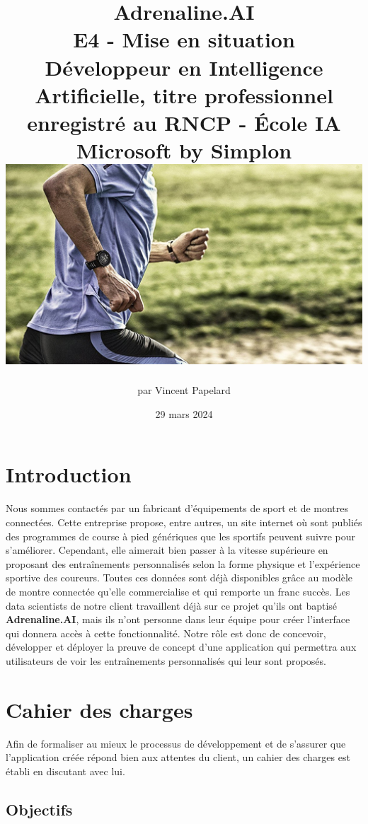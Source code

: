 \documentclass[french]{article}
\title{%
    \huge Adrenaline.AI  \\
    \bigskip
    \large E4 - Mise en situation \\ 
    Développeur en Intelligence Artificielle,
    titre professionnel enregistré au RNCP - École IA Microsoft by Simplon
    \vfill
    \includegraphics[width=14cm]{running.jpeg}
    \vfill}
\date{29 mars 2024}
\author{par Vincent Papelard}
\begin{document}
    \renewcommand{\contentsname}{Table des Matières}
    \renewcommand{\refname}{Références}
    \maketitle
    \newpage
    \tableofcontents
    \newpage

    \section*{Introduction}

    Nous sommes contactés par un fabricant d'équipements de sport et de montres connectées. Cette entreprise propose, entre autres, un site internet où sont publiés des programmes de course à pied génériques que les sportifs peuvent suivre pour s'améliorer. Cependant, elle aimerait bien passer à la vitesse supérieure en proposant des entraînements personnalisés selon la forme physique et l'expérience sportive des coureurs. Toutes ces données sont déjà disponibles grâce au modèle de montre connectée qu'elle commercialise et qui remporte un franc succès. Les data scientists de notre client travaillent déjà sur ce projet qu'ils ont baptisé \textbf{Adrenaline.AI}, mais ils n'ont personne dans leur équipe pour créer l'interface qui donnera accès à cette fonctionnalité. Notre rôle est donc de concevoir, développer et déployer la preuve de concept d'une application qui permettra aux utilisateurs de voir les entraînements personnalisés qui leur sont proposés.
    \section{Cahier des charges}

    Afin de formaliser au mieux le processus de développement et de s'assurer que l'application créée répond bien aux attentes du client, un cahier des charges est établi en discutant avec lui.

    \subsection{Objectifs}
\end{document}
